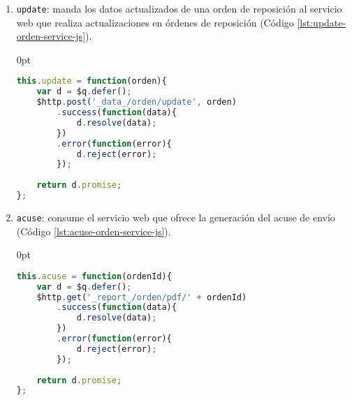 \begin{enumerate}
\begin{enumerate}
\begin{adjustwidth}{\listingfixlargewidth}{0pt}
\begin{lstlisting}[language=Javascript, caption={Función para consumir el servicio web que obtiene los datos de una orden de reposición.}, captionpos=b, label={lst:get-orden-service-js}]
	return d.promise;
};
\end{lstlisting}
\end{adjustwidth}
	\item \texttt{update}: manda los datos actualizados de una orden de reposición al servicio web que realiza actualizaciones en órdenes de reposición (Código \ref{lst:update-orden-service-js}).
\begin{adjustwidth}{\listingfixlargewidth}{0pt}
\begin{lstlisting}[language=Javascript, caption={Función para actualizar los datos de una orden de reposición.}, captionpos=b, label={lst:update-orden-service-js}]
this.update = function(orden){
	var d = $q.defer();
	$http.post('_data_/orden/update', orden)
		.success(function(data){
			d.resolve(data);
		})
		.error(function(error){
			d.reject(error);
		});
	
	return d.promise;
};
\end{lstlisting}
\end{adjustwidth}
	\item \texttt{acuse}: consume el servicio web que ofrece la generación del acuse de envío (Código \ref{lst:acuse-orden-service-js}).
\begin{adjustwidth}{\listingfixlargewidth}{0pt}
\begin{lstlisting}[language=Javascript, caption={Función para mandar la generación del acuse de envío de una orden de reposición.}, captionpos=b, label={lst:acuse-orden-service-js}]
this.acuse = function(ordenId){
	var d = $q.defer();
	$http.get('_report_/orden/pdf/' + ordenId)
		.success(function(data){
			d.resolve(data);
		})
		.error(function(error){
			d.reject(error);
		});
	
	return d.promise;
};
\end{lstlisting}
\end{adjustwidth}
\end{enumerate}
\end{enumerate}

